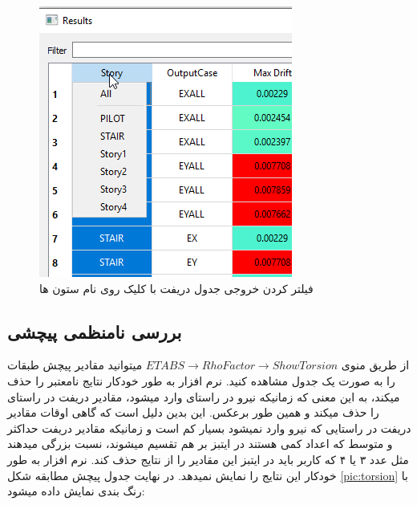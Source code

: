  
\begin{figure}[H]
    \centering
    \includegraphics[scale=0.7]{figures/drift_filter}
    \caption{فیلتر کردن خروجی جدول دریفت با کلیک روی نام ستون ها}
    \label{pic:drift_filter}
\end{figure}

\subsection{بررسی نامنظمی پیچشی}
از طریق منوی 
$ETABS \rightarrow Rho Factor \rightarrow Show Torsion$
میتوانید مقادیر پیچش طبقات را به صورت یک جدول مشاهده کنید. نرم افزار به طور خودکار نتایج نامعتبر را حذف میکند، به این معنی که زمانیکه نیرو در راستای 
وارد میشود، مقادیر دریفت در راستای  را حذف میکند و همین طور برعکس. این بدین دلیل است که گاهی اوقات مقادیر دریفت در راستایی که نیرو وارد نمیشود
بسیار کم است و زمانیکه مقادیر دریفت حداکثر و متوسط که اعداد کمی هستند در ایتبز بر هم تقسیم میشوند،‌ نسبت بزرگی میدهند مثل عدد ۳ یا ۴ که کاربر باید در ایتبز این
مقادیر را از نتایج حذف کند. نرم افزار به طور خودکار این نتایج را نمایش نمیدهد. در نهایت جدول پیچش مطابقه شکل 
\ref{pic:torsion}
با رنگ بندی نمایش داده میشود:

